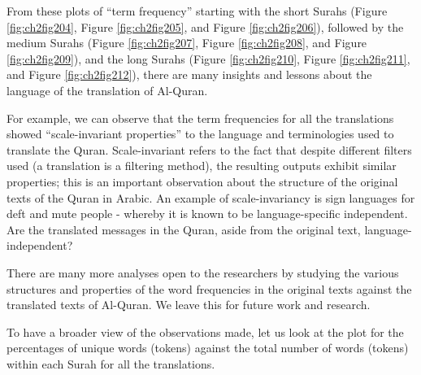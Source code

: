 \documentclass[
]{article}
\begin{document}
From these plots of ``term frequency'' starting with the short Surahs (Figure \ref{fig:ch2fig204}, Figure \ref{fig:ch2fig205}, and Figure \ref{fig:ch2fig206}), followed by the medium Surahs (Figure \ref{fig:ch2fig207}, Figure \ref{fig:ch2fig208}, and Figure \ref{fig:ch2fig209}), and the long Surahs (Figure \ref{fig:ch2fig210}, Figure \ref{fig:ch2fig211}, and Figure \ref{fig:ch2fig212}), there are many insights and lessons about the language of the translation of Al-Quran.

For example, we can observe that the term frequencies for all the translations showed ``scale-invariant properties'' to the language and terminologies used to translate the Quran. Scale-invariant refers to the fact that despite different filters used (a translation is a filtering method), the resulting outputs exhibit similar properties; this is an important observation about the structure of the original texts of the Quran in Arabic. An example of scale-invariancy is sign languages for deft and mute people - whereby it is known to be language-specific independent. Are the translated messages in the Quran, aside from the original text, language-independent?

There are many more analyses open to the researchers by studying the various structures and properties of the word frequencies in the original texts against the translated texts of Al-Quran. We leave this for future work and research.

To have a broader view of the observations made, let us look at the plot for the percentages of unique words (tokens) against the total number of words (tokens) within each Surah for all the translations.
\end{document}
